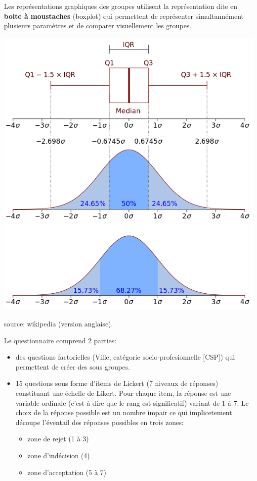 \documentclass[]{article}
\begin{document}
Les représentations graphiques des groupes utilisent la représentation
dite en \textbf{boite à moustaches} (boxplot) qui permettent de
représenter simultannément plusieurs paramètres et de comparer
visuellement les groupes.

\includegraphics{Boxplot.png}

source: wikipedia (version anglaise).

Le questionnaire comprend 2 parties:

\begin{itemize}
\itemsep1pt\parskip0pt
\item
  des questions factorielles (Ville, catégorie socio-profesionnelle
  {[}CSP{]}) qui permettent de créer des sous groupes.
\item
  15 questions sous forme d'items de Lickert (7 niveaux de réponses)
  constituant une échelle de Likert. Pour chaque item, la réponse est
  une variable ordinale (c'est à dire que le rang est significatif)
  variant de 1 à 7. Le choix de la réponse possible est un nombre impair
  ce qui implicetement découpe l'éventail des réponses possibles en
  trois zones:

  \begin{itemize}
  \itemsep1pt\parskip0pt
  \item
    zone de rejet (1 à 3)
  \item
    zone d'indécision (4)
  \item
    zone d'acceptation (5 à 7)
  \end{itemize}
\end{itemize}
\end{document}
